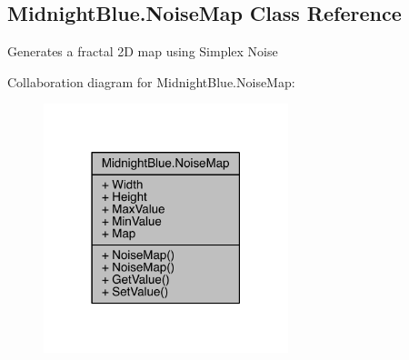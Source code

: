 \hypertarget{class_midnight_blue_1_1_noise_map}{}\subsection{Midnight\+Blue.\+Noise\+Map Class Reference}
\label{class_midnight_blue_1_1_noise_map}


Generates a fractal 2D map using Simplex Noise  




Collaboration diagram for Midnight\+Blue.\+Noise\+Map\+:\nopagebreak
\begin{figure}[H]
\begin{center}
\leavevmode
\includegraphics[width=202pt]{class_midnight_blue_1_1_noise_map__coll__graph}
\end{center}
\end{figure}
